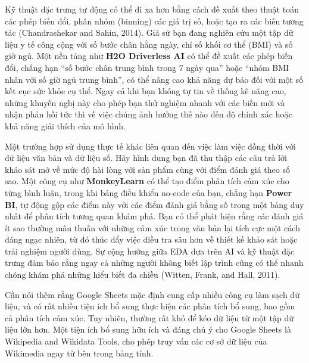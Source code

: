Kỹ thuật đặc trưng tự động có thể đi xa hơn bằng cách đề xuất theo thuật toán các phép biến đổi, phân nhóm (binning) các giá trị số, hoặc tạo ra các biến tương tác (Chandrashekar and Sahin, 2014). Giả sử bạn đang nghiên cứu một tập dữ liệu y tế công cộng với số bước chân hằng ngày, chỉ số khối cơ thể (BMI) và số giờ ngủ. Một nền tảng như \textbf{H2O Driverless AI} có thể đề xuất các phép biến đổi, chẳng hạn ``số bước chân trung bình trong 7 ngày qua'' hoặc ``nhóm BMI nhân với số giờ ngủ trung bình'', có thể nâng cao khả năng dự báo đối với một số kết cục sức khỏe cụ thể. Ngay cả khi bạn không tự tin về thống kê nâng cao, những khuyến nghị này cho phép bạn thử nghiệm nhanh với các biến mới và nhận phản hồi tức thì về việc chúng ảnh hưởng thế nào đến độ chính xác hoặc khả năng giải thích của mô hình.

Một trường hợp sử dụng thực tế khác liên quan đến việc làm việc đồng thời với dữ liệu văn bản và dữ liệu số. Hãy hình dung bạn đã thu thập các câu trả lời khảo sát mở về mức độ hài lòng với sản phẩm cùng với điểm đánh giá theo số sao. Một công cụ như \textbf{MonkeyLearn} có thể tạo điểm phân tích cảm xúc cho từng bình luận, trong khi bảng điều khiển no-code của bạn, chẳng hạn \textbf{Power BI}, tự động gộp các điểm này với các điểm đánh giá bằng số trong một bảng duy nhất để phân tích tương quan khám phá. Bạn có thể phát hiện rằng các đánh giá ít sao thường mâu thuẫn với những cảm xúc trong văn bản lại tích cực một cách đáng ngạc nhiên, từ đó thúc đẩy việc điều tra sâu hơn về thiết kế khảo sát hoặc trải nghiệm người dùng. Sự cộng hưởng giữa EDA dựa trên AI và kỹ thuật đặc trưng đảm bảo rằng ngay cả những người không biết lập trình cũng có thể nhanh chóng khám phá những hiểu biết đa chiều (Witten, Frank, and Hall, 2011).

Cần nói thêm rằng Google Sheets mặc định cung cấp nhiều công cụ làm sạch dữ liệu, và có rất nhiều tiện ích bổ sung thực hiện các phân tích bổ sung, bao gồm cả phân tích cảm xúc. Tuy nhiên, thường rất khó để kéo dữ liệu từ một tập dữ liệu lớn hơn. Một tiện ích bổ sung hữu ích và đáng chú ý cho Google Sheets là Wikipedia and Wikidata Tools, cho phép truy vấn các cơ sở dữ liệu của Wikimedia ngay từ bên trong bảng tính.

